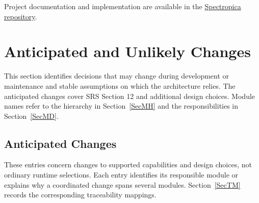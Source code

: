 \documentclass[12pt, titlepage]{article}
\begin{document}
Project documentation and implementation are available in the
\href{https://github.com/meena-alomran/game-n-grow}{Spectropica repository}.

\section{Anticipated and Unlikely Changes} \label{SecChange}

This section identifies decisions that may change during development or
maintenance and stable assumptions on which the architecture relies.
The anticipated changes cover SRS Section 12 and additional design choices.
Module names refer to the hierarchy in Section~\ref{SecMH} and the
responsibilities in Section~\ref{SecMD}.

\subsection{Anticipated Changes} \label{SecAchange}

These entries concern changes to supported capabilities and design choices,
not ordinary runtime selections. Each entry identifies its responsible
module or explains why a coordinated change spans several modules.
Section~\ref{SecTM} records the corresponding traceability mappings.
\end{document}
